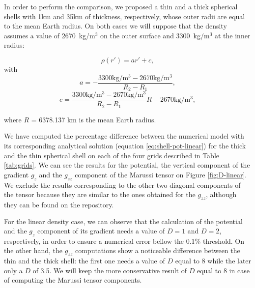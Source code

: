 \documentclass[extra]{gji}
\begin{document}
In order to perform the comparison, we proposed a thin and a thick
spherical shells with 1km and 35km of thickness, respectively, whose
outer radii are equal to the mean Earth radius.
On both cases we will suppose that the density assumes a value of
2670~kg/m$^3$ on the outer surface and 3300~kg/m$^3$ at the inner
radius:

\begin{equation}
    \rho(r') = ar' + c,
    \label{eq:density-linear}
\end{equation}
\noindent with
\begin{equation}
    a = -\frac{3300\text{kg/m$^3$} - 2670\text{kg/m$^3$}}{R_2 - R_1},
\end{equation}
\begin{equation}
    c = \frac{3300\text{kg/m$^3$} -
        2670\text{kg/m$^3$}}{R_2 - R_1} R +
        2670\text{kg/m$^3$},
\end{equation}

\noindent where $R$ = 6378.137 km is the mean Earth radius.

We have computed the percentage difference between the numerical model
with its corresponding analytical solution (equation
\ref{eq:shell-pot-linear}) for the thick and the thin spherical shell
on each of the four grids described in Table \ref{tab:grids}.
We can see the results for the potential, the vertical component of the
gradient $g_z$ and the $g_{zz}$ component of the Marussi tensor on
Figure \ref{fig:D-linear}.
We exclude the results corresponding to the other two diagonal
components of the tensor because they are similar to the ones obtained
for the $g_{zz}$, although they can be found on the repository.

For the linear density case, we can observe that the calculation of the
potential and the $g_z$ component of its gradient needs a value of
$D=1$ and $D=2$, respectively, in order to ensure a numerical error
bellow the 0.1\% threshold.
On the other hand, the $g_{zz}$ computations show a noticeable
difference between the thin and the thick shell: the first one needs a
value of $D$ equal to 8 while the later only a $D$ of 3.5.
We will keep the more conservative result of $D$ equal to 8 in case of
computing the Marussi tensor components.
\end{document}
